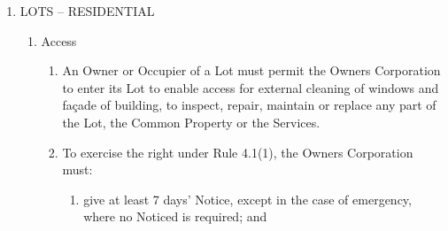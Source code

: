 \documentclass{article}
\begin{document}
\begin{enumerate}[label=\arabic*.]
\begin{enumerate}[label=\arabic{enumi}.\arabic*.]
\begin{enumerate}[label=(\arabic*)]
\begin{enumerate}[label=(\arabic*)]
\begin{enumerate}[label=(\alph*)]
\item  directions given by the Manager in connection with use of the central courtyard.

\end{enumerate}

\item  If a noise or behavioural complaint is made against any Owner or Occupier in respect of that Owner’s or Occupier’s use or occupation of the central courtyard, the Manager may direct that the Owner or Occupier cease the noise or activity, or leave the central courtyard, and the Owner or Occupier must immediately comply with that direction.

\item  Only background music shall be played within the central courtyard, and for this purpose, a mini portable speaker can be brought into the central courtyard. For the purpose of this Rule, ‘background music’ means music at a level that enables Owners, Occupiers or invitees to conduct an uninterrupted or undisturbed conversation at a distance of 600mm within the central courtyard

\end{enumerate}

\end{enumerate}

\item  LOTS – RESIDENTIAL

\begin{enumerate}[label=\arabic{enumi}.\arabic*.]

\item  Access

\begin{enumerate}[label=(\arabic*)]

\item  An Owner or Occupier of a Lot must permit the Owners Corporation to enter its Lot to enable access for external cleaning of windows and façade of building, to inspect, repair, maintain or replace any part of the Lot, the Common Property or the Services.

\item  To exercise the right under Rule 4.1(1), the Owners Corporation must:

\begin{enumerate}[label=(\alph*)]

\item  give at least 7 days’ Notice, except in the case of emergency, where no Noticed is required; and


\end{enumerate}
\end{enumerate}
\end{enumerate}
\end{enumerate}
\end{enumerate}
\end{document}
